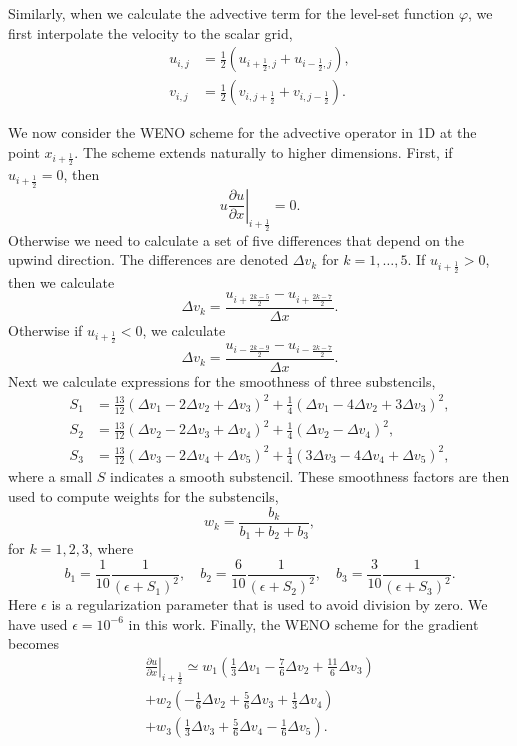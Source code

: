 \documentclass[11pt,b5paper,DIV=calc,BCOR1.3cm,headings=small,%
               footinclude=false,headsepline]{scrbook}
\newcommand*{\pd}[2]{\ensuremath{\frac{\partial #1}{\partial{#2}}}}
\begin{document}
Similarly, when we calculate the advective term for the level-set function
$\varphi$, we first interpolate the velocity to the scalar grid,
\begin{align}
  u_{i,j} &= \frac 1 2\left( u_{i+\frac 1 2,j} + u_{i-\frac 1 2,j} \right), \\
  v_{i,j} &= \frac 1 2\left( v_{i,j+\frac 1 2} + v_{i,j-\frac 1 2} \right).
\end{align}

We now consider the WENO scheme for the advective operator in 1D at the point
$x_{i+\frac 1 2}$.  The scheme extends naturally to higher dimensions.  First,
if $u_{i+\frac 1 2} = 0$, then
\begin{equation}
  \left. u\pd u x \right|_{i+\frac 1 2} = 0.
\end{equation}
Otherwise we need to calculate a set of five differences that depend on the
upwind direction.  The differences are denoted $\Delta v_k$ for $k=1,\dots,5$.
If $u_{i+\frac 1 2}>0$, then we calculate
\begin{equation}
  \Delta v_k = \frac{u_{i+\frac{2k-5} 2} - u_{i+\frac{2k-7} 2}}{\Delta x}.
\end{equation}
Otherwise if $u_{i+\frac 1 2}<0$, we calculate
\begin{equation}
  \Delta v_k = \frac{u_{i-\frac{2k-9} 2} - u_{i-\frac{2k-7} 2}}{\Delta x}.
\end{equation}
Next we calculate expressions for the smoothness of three substencils,
\begin{align}
  S_1 &= \frac{13}{12}(\Delta v_1 - 2\Delta v_2 + \Delta v_3)^2
    + \frac 1 4 (\Delta v_1 - 4\Delta v_2 + 3\Delta v_3)^2, \\
  S_2 &= \frac{13}{12}(\Delta v_2 - 2\Delta v_3 + \Delta v_4)^2
    + \frac 1 4 (\Delta v_2 - \Delta v_4)^2, \\
  S_3 &= \frac{13}{12}(\Delta v_3 - 2\Delta v_4 + \Delta v_5)^2
    + \frac 1 4 (3\Delta v_3 - 4\Delta v_4 + \Delta v_5)^2,
\end{align}
where a small $S$ indicates a smooth substencil.  These smoothness factors are
then used to compute weights for the substencils,
\begin{equation}
  w_k = \frac{b_k}{b_1+b_2+b_3},
\end{equation}
for $k = 1,2,3$, where
\begin{equation}
  b_1 = \frac 1 {10}\frac 1 {(\epsilon+S_1)^2},\quad
  b_2 = \frac 6 {10}\frac 1 {(\epsilon+S_2)^2},\quad
  b_3 = \frac 3 {10}\frac 1 {(\epsilon+S_3)^2}.
\end{equation}
Here $\epsilon$ is a regularization parameter that is used to avoid division by
zero.  We have used $\epsilon = 10^{-6}$ in this work.  Finally, the WENO
scheme for the gradient becomes
\begin{multline}
  \left. \pd u x \right|_{i+\frac 1 2} \simeq
      w_1\left(\frac 1 3\Delta v_1 - \frac 7 6\Delta v_2
        + \frac{11} 6 \Delta v_3\right) \\
    + w_2\left(-\frac 1 6\Delta v_2 + \frac 5 6\Delta v_3
        + \frac 1 3 \Delta v_4\right) \\
    + w_3\left(\frac1 3\Delta v_3 + \frac 5 6\Delta v_4
        - \frac 1 6 \Delta v_5\right).
\end{multline}
\end{document}
